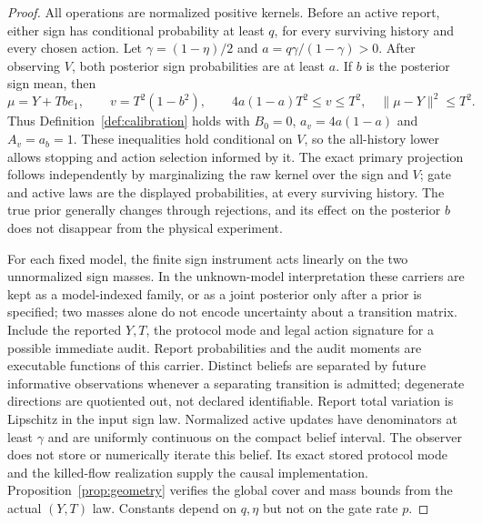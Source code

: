 \begin{proof}
All operations are normalized positive kernels. Before an active report, either sign has conditional probability at least $q$, for every surviving history and every chosen action. Let $\gamma=(1-\eta)/2$ and $a=q\gamma/(1-\gamma)>0$. After observing $V$, both posterior sign probabilities are at least $a$. If $b$ is the posterior sign mean, then
\[
 \mu=Y+Tb e_1,\qquad v=T^2(1-b^2),\qquad
 4a(1-a)T^2\le v\le T^2,\quad \|\mu-Y\|^2\le T^2.
\]
Thus Definition~\ref{def:calibration} holds with $B_0=0$, $a_v=4a(1-a)$ and $A_v=a_b=1$. These inequalities hold conditional on $V$, so the all-history lower allows stopping and action selection informed by it. The exact primary projection follows independently by marginalizing the raw kernel over the sign and $V$; gate and active laws are the displayed probabilities, at every surviving history. The true prior generally changes through rejections, and its effect on the posterior $b$ does not disappear from the physical experiment.

For each fixed model, the finite sign instrument acts linearly on the two unnormalized sign masses. In the unknown-model interpretation these carriers are kept as a model-indexed family, or as a joint posterior only after a prior is specified; two masses alone do not encode uncertainty about a transition matrix. Include the reported $Y,T$, the protocol mode and legal action signature for a possible immediate audit. Report probabilities and the audit moments are executable functions of this carrier. Distinct beliefs are separated by future informative observations whenever a separating transition is admitted; degenerate directions are quotiented out, not declared identifiable. Report total variation is Lipschitz in the input sign law. Normalized active updates have denominators at least $\gamma$ and are uniformly continuous on the compact belief interval. The observer does not store or numerically iterate this belief. Its exact stored protocol mode and the killed-flow realization supply the causal implementation. Proposition~\ref{prop:geometry} verifies the global cover and mass bounds from the actual $(Y,T)$ law. Constants depend on $q,\eta$ but not on the gate rate $p$.
\end{proof}

